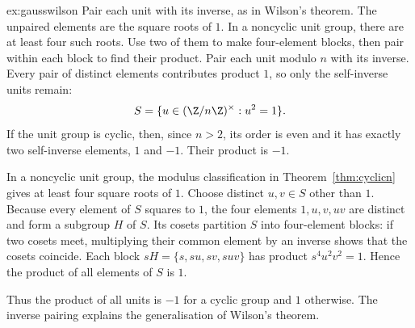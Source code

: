 \begin{solution}{ex:gausswilson}
\idea Pair each unit with its inverse, as in Wilson's theorem. The unpaired elements are the square roots of $1$. In a noncyclic unit group, there are at least four such roots. Use two of them to make four-element blocks, then pair within each block to find their product.
\writeup Pair each unit modulo $n$ with its inverse. Every pair of distinct elements contributes product $1$, so only the self-inverse units remain:
\[
S=\{u\in(\Z/n\Z)^\times:u^2=1\}.
\]
If the unit group is cyclic, then, since $n>2$, its order is even and it has exactly two self-inverse elements, $1$ and $-1$. Their product is $-1$.

In a noncyclic unit group, the modulus classification in Theorem~\ref{thm:cyclicn} gives at least four square roots of $1$. Choose distinct $u,v\in S$ other than $1$. Because every element of $S$ squares to $1$, the four elements $1,u,v,uv$ are distinct and form a subgroup $H$ of $S$. Its cosets partition $S$ into four-element blocks: if two cosets meet, multiplying their common element by an inverse shows that the cosets coincide. Each block $sH=\{s,su,sv,suv\}$ has product $s^4u^2v^2=1$. Hence the product of all elements of $S$ is $1$.

Thus the product of all units is $-1$ for a cyclic group and $1$ otherwise. The inverse pairing explains the generalisation of Wilson's theorem.
\end{solution}

